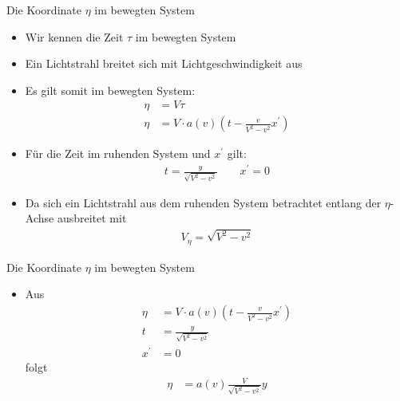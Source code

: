 \documentclass[]{beamer}%
\begin{document}
\begin{frame}{Die Koordinate $\eta$ im bewegten System}
    \begin{itemize}
        \item Wir kennen die Zeit $\tau$ im bewegten System
        \item Ein Lichtstrahl breitet sich mit Lichtgeschwindigkeit aus
        \item Es gilt somit im bewegten System:
            \begin{align*}
                \eta     &=  V\tau\\
                \eta     &=  V \cdot a\left(v\right) \left(
                                t-\frac{v}{V^2-v^2} x^\prime
                            \right)
            \end{align*}
        \item Für die Zeit im ruhenden System und $x^\prime$ gilt:
            \begin{align*}
                t   =   \frac{y}{
                            \sqrt{V^2-v^2}
                        }
                \quad\quad
                x^\prime = 0
            \end{align*}
        \item Da sich ein Lichtstrahl aus dem ruhenden System betrachtet 
                entlang der $\eta$-Achse ausbreitet mit
            \begin{align*}
                    V_{\eta} 
                    =
                    \sqrt{V^2-v^2}
            \end{align*}
    \end{itemize}
\end{frame}

\begin{frame}{Die Koordinate $\eta$ im bewegten System}
    \begin{itemize}
        \item Aus
            \begin{align*}
                \eta     &=  V \cdot a\left(v\right) \left(
                                t-\frac{v}{V^2-v^2} x^\prime
                            \right)
                \\
                t  
                &=   \frac{y}{
                            \sqrt{V^2-v^2}
                        }
                \\
                x^\prime 
                &= 0
            \end{align*}
            folgt
            \begin{align*}
                \eta     &=   a\left(v\right) 
                                \frac{V}{\sqrt{V^2-v^2}} y
            \end{align*}
    \end{itemize}
\end{frame}
\end{document}
